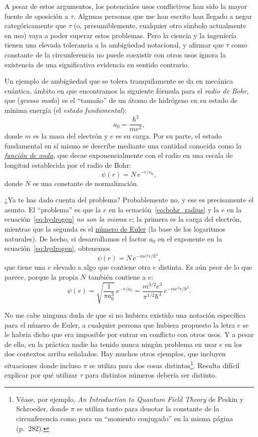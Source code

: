 A pesar de estos argumentos, los potenciales usos conflictivos han sido la mayor fuente de oposición a $\tau$. Algunas personas que me han escrito han llegado a negar categóricamente que $\tau$ (o, presumiblemente, cualquier otro símbolo actualmente en uso) vaya a poder superar estos problemas. Pero la ciencia y la ingeniería tienen una elevada tolerancia a la ambigüedad notacional, y afirmar que $\tau$ como constante de la circunferencia no puede coexistir con otros usos ignora la existencia de una significativa evidencia en sentido contrario.

Un ejemplo de  ambigüedad que se tolera tranquilamente se da en mecánica cuántica, ámbito en que encontramos la siguiente fórmula para el  \emph{radio de Bohr}, que (\textit{grosso modo}) es el ``tamaño'' de un átomo de hidrógeno en su estado de mínima energía (el \emph{estado fundamental}):
\begin{equation}
  \label{eq:bohr_radius}
  a_0 = \frac{\hbar^2}{m e^2},
  \end{equation}
donde $m$ es la masa del electrón y $e$ es su carga. Por su parte, el estado fundamental en sí mismo se describe mediante una cantidad conocida como la \href{https://es.wikipedia.org/wiki/Función_de_onda}{\emph{función de onda}}, que decae exponencialmente con el radio en una escala de longitud establecida por el radio de Bohr:
\begin{equation}
\label{eq:hydrogen}
\psi(r) = N\,e^{-r/a_0},
\end{equation}
donde $N$ es una constante de normalización.

¿Ya te has dado cuenta del problema? Probablemente no, y ese es precisamente el asunto. El ``problema'' es que la $e$ en la ecuación~\eqref{eq:bohr_radius} y la $e$ en la ecuación~\eqref{eq:hydrogen} \emph{no son la misma $e$}; la primera es la carga del electrón, mientras que la segunda es el \href{https://es.wikipedia.org/wiki/N%C3%BAmero_e}{número de Euler} (la base de los logaritmos naturales). De hecho, si desarrollamos el factor $a_0$ en el exponente en la ecuación~\eqref{eq:hydrogen}, obtenemos
\[
\psi(r) = N\,e^{-m e^2 r/\hbar^2},
\]
que tiene una $e$ elevado a algo que contiene otra $e$ distinta. Es aún peor de lo que parece, porque la propia $N$ también contiene a $e$:
\[
\psi(r) = \sqrt{\frac{1}{\pi a_0^3}}\,e^{-r/a_0} =
\frac{m^{3/2} e^3}{\pi^{1/2} \hbar^3}\,e^{-m e^2 r/\hbar^2}.
\]

No me cabe ninguna duda de que si no hubiera existido una notación específica para el número de Euler, a cualquier persona que hubiera propuesto la letra $e$ se le habría dicho que era imposible por entrar en conflicto con otros usos. Y a pesar de ello, en la práctica nadie ha tenido nunca ningún problema en usar $e$ en los dos contextos arriba señalados. Hay muchos otros ejemplos, que incluyen situaciones donde incluso $\pi$ se utiliza para dos cosas distintas\footnote{Véase, por ejemplo, \emph{An Introduction to Quantum Field Theory} de Peskin y Schroeder, donde $\pi$ se utiliza tanto para denotar la constante de la circunferencia como para un ``momento conjugado'' en la misma página (p.~282).}. Resulta difícil explicar por qué utilizar $\tau$ para distintos números debería ser distinto.

